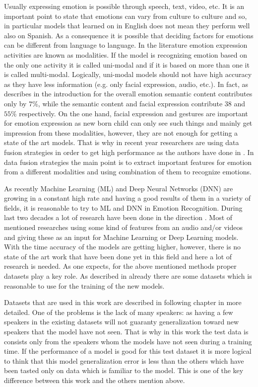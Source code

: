 \documentclass[oneside]{report}
\begin{document}
    
    Usually expressing emotion is possible through speech, text, video, etc.  It is an important point to state that emotions can vary from culture to culture and so, in particular models that learned on in English does not mean they perform well also on Spanish. As a consequence it is possible that deciding factors for emotions can be different from language to language. In the literature emotion expression activities are known as modalities. If the model is recognizing emotion based on the only one  activity it is called uni-modal and if it is based on more than one it is called multi-modal. Logically, uni-modal models should not have high accuracy as they have less information (e.g. only facial expression, audio, etc.). In fact, as \cite{google_survey} describes in the introduction for the overall emotion semantic content contributes only by $7\%$, while the semantic content and facial expression contribute $38$ and $55\%$ respectively. On the one hand, facial expression and gestures are important for emotion expression as new born child can only see such things and mainly get impression from these modalities, however, they are not enough for getting a state of the art models. That is why in recent year researchers are using data fusion strategies in order to get high performance as the authors have done in \cite{china_2020}. In data fusion strategies the main point is to extract important features for emotion from a different modalities and using combination of them to recognize emotions.
    
    
    As recently Machine Learning (ML) and Deep Neural Networks (DNN) are growing in a constant high rate and having a good results of them in a variety of fields, it is reasonable to try to ML and DNN in Emotion Recognition. During last two decades a lot of research have been done in the direction \cite{china_2020, stanford_2020, india_2020, slovenia_2014, waterloo_2019, estonia_2018, stuttgart_2021, china_2020_1, india_2014}. Most of mentioned researches using some kind of features from an audio and/or videos and giving these as an input for Machine Learning or Deep Learning models. With the time accuracy of the models are getting higher, however, there is no state of the art work that have been done yet in this field and here a lot of research is needed. As one expects, for the above mentioned methods proper datasets play a key role. As described in \cite{google_survey} already there are some datasets which is reasonable to use for the training of the new models. 
    
    Datasets that are used in this work are described in following chapter in more detailed. One of the problems is the lack of many speakers: as having a few speakers in the existing datasets will not guaranty generalization toward new speakers that the model have not seen. That is why in this work the test data is consists only from the speakers whom the models have not seen during a training time. If the performance of a model is good for this test dataset it is more logical to think that this model generalization error is less than the others which have been tasted only on data which is familiar to the model. This is one of the key difference between this work and the others mention above. 
    
\end{document}
